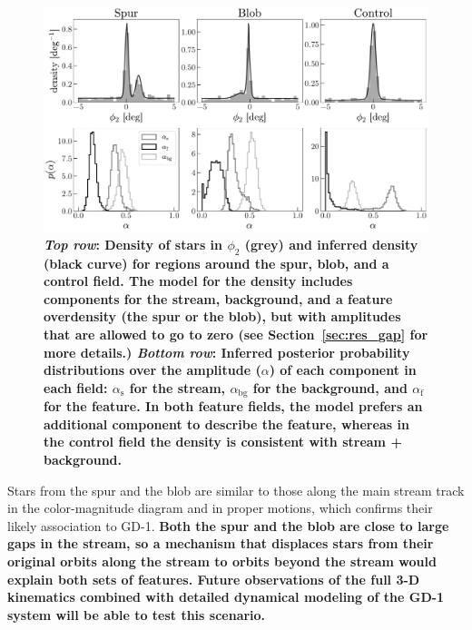 \documentclass[modern]{aastex62}
\newcommand{\sectionname}{Section}
\newcommand{\changes}[1]{{\textbf{#1}}}
\begin{document}
\begin{figure}
\begin{center}
\includegraphics[width=\textwidth]{density-model.pdf}
\end{center}
\caption{
\changes{\emph{Top row}: Density of stars in $\phi_2$ (grey) and inferred density (black curve) for regions around the spur, blob, and a control field.
The model for the density includes components for the stream, background, and a feature overdensity (the spur or the blob), but with amplitudes that are allowed to go to zero (see \sectionname~\ref{sec:res_gap} for more details.)
\emph{Bottom row}: Inferred posterior probability distributions over the amplitude ($\alpha$) of each component in each field: $\alpha_{\textrm{s}}$ for the stream, $\alpha_{\textrm{bg}}$ for the background, and $\alpha_{\textrm{f}}$ for the feature.
In both feature fields, the model prefers an additional component to describe the feature, whereas in the control field the density is consistent with stream + background.}
}
\label{fig:density-model}
\end{figure}

Stars from the spur and the blob are similar to those along the main stream track in the color-magnitude diagram and in proper motions, which confirms their likely association to GD-1.
\changes{Both the spur and the blob are close to large gaps in the stream, so a mechanism that displaces stars from their original orbits along the stream to orbits beyond the stream would explain both sets of features.
Future observations of the full 3-D kinematics combined with detailed dynamical modeling of the GD-1 system will be able to test this scenario.}

\end{document}
